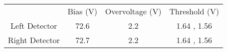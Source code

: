 \begin{tabular}{cccc}
& Bias (V) & Overvoltage (V) & Threshold (V) \\
Left Detector  &     72.6 &             2.2 &   1.64 , 1.56 \\
Right Detector &     72.7 &             2.2 &   1.64 , 1.56 \\
\end{tabular}

